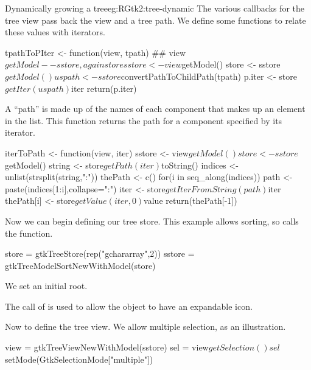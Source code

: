 \begin{example}{Dynamically growing a tree}{eg:RGtk2:tree-dynamic}
The various callbacks for the tree view pass back the view and a tree
path. We define some functions to relate these values with iterators.
\begin{Schunk}
\begin{Sinput}
 tpathToPIter <- function(view, tpath) {
   ## view$getModel -- sstore, again store
   sstore <- view$getModel()
   store <- sstore$getModel()
   uspath <- sstore$convertPathToChildPath(tpath)
   p.iter <- store$getIter(uspath)$iter
   return(p.iter)
 }
\end{Sinput}
\end{Schunk}

A ``path'' is made up of the names of each component that makes up an
element in the list. This function returns the path for a component
specified by its iterator.
\begin{Schunk}
\begin{Sinput}
 iterToPath <- function(view, iter) {
   sstore <- view$getModel()
   store <- sstore$getModel()
   string <- store$getPath(iter)$toString()
   indices <- unlist(strsplit(string,":"))
   thePath <- c()
   for(i in seq_along(indices)) {
     path <- paste(indices[1:i],collapse=":")
     iter <- store$getIterFromString(path)$iter
     thePath[i] <- store$getValue(iter,0)$value
   }
   return(thePath[-1])
 }
\end{Sinput}
\end{Schunk}

Now we can begin defining our tree store. This example allows sorting,
so calls the  function.
\begin{Schunk}
\begin{Sinput}
 store = gtkTreeStore(rep("gchararray",2))
 sstore = gtkTreeModelSortNewWithModel(store)
\end{Sinput}
\end{Schunk}

We set an initial root.
\begin{Schunk}
\end{Schunk}
The call of  is used to allow the object
to have an expandable icon. 


Now to define the tree view. We allow multiple selection, as an illustration.
\begin{Schunk}
\begin{Sinput}
 view = gtkTreeViewNewWithModel(sstore)
 sel = view$getSelection()
 sel$setMode(GtkSelectionMode["multiple"])
\end{Sinput}
\end{Schunk}


\end{example}

